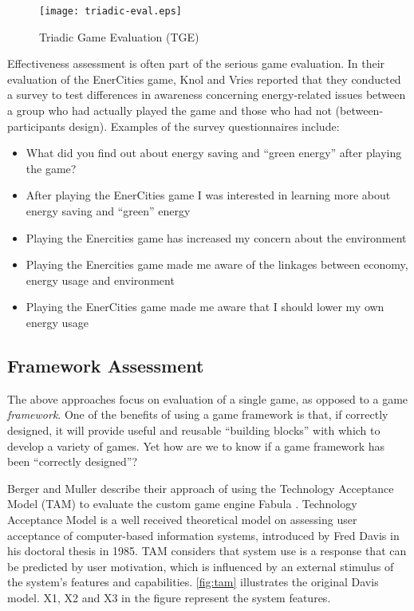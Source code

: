 \begin{figure}[ht!]
	\centering
		\texttt{[image: triadic-eval.eps]}
		\caption{Triadic Game Evaluation (TGE) \cite{harteveld2010triadic}}
		\label{fig:triadic-game-eval}
\end{figure}

Effectiveness assessment is often part of the serious game evaluation. In their evaluation of the EnerCities game, Knol and Vries reported that they conducted a survey to test differences in awareness concerning energy-related issues between a group who had actually played the game and those who had not (between-participants design). Examples of the survey questionnaires include:
\begin{itemize}
\item What did you find out about energy saving and ``green energy'' after playing the game?
\item After playing the EnerCities game I was interested in learning more about energy saving and ``green'' energy
\item Playing the Enercities game has increased my concern about the environment
\item Playing the Enercities game made me aware of the linkages between economy, energy usage and environment
\item Playing the EnerCities game made me aware that I should lower my own energy usage
\end{itemize}

\subsection{Framework Assessment}

The above approaches focus on evaluation of a single game, as opposed to a game {\em
  framework}. One of the benefits of using a game framework is that, if correctly designed, it will provide useful and reusable ``building blocks'' with which to develop a variety of games. Yet how are we to know if a game framework has been ``correctly designed''?

Berger and Muller \cite {fabulaengine} describe their approach of using the Technology Acceptance Model (TAM) to evaluate the custom game engine Fabula \cite{fabula}. Technology Acceptance Model \cite {davis1986technology} is a well received theoretical model on assessing user acceptance of computer-based information systems, introduced by Fred Davis in his doctoral thesis in 1985. TAM considers that system use is a response that can be predicted by user motivation, which is influenced by an external stimulus of the system's features and capabilities. \autoref{fig:tam} illustrates the original Davis model. X1, X2 and X3 in the figure represent the system features.

